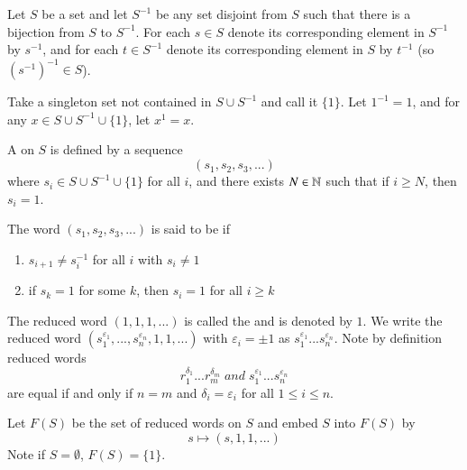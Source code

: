 \documentclass[12pt, a4paper, oneside, openright, titlepage]{book}
\begin{document}
\begin{cons}
        Let $S$ be a set and let $S^{-1}$ be any set disjoint from $S$ such that there is a bijection from $S$ to $S^{-1}$. For each $s \in S$ denote its corresponding element in $S^{-1}$ by $s^{-1}$, and for each $t \in S^{-1}$ denote its corresponding element in $S$ by $t^{-1}$ (so $(s^{-1})^{-1} \in S$). 

        Take a singleton set not contained in $S \cup S^{-1}$ and call it $\{1\}$. Let $1^{-1} = 1$, and for any $x \in S\cup S^{-1}\cup\{1\}$, let $x^1 = x$.

        A  on $S$ is defined by a sequence \begin{equation}
                (s_1,s_2,s_3,...)
        \end{equation}
        where $s_i \in S\cup S^{-1} \cup \{1\}$ for all $i$, and there exists $N \in \mathbb N$ such that if $i \geq N$, then $s_i = 1$.

        The word $(s_1,s_2,s_3,...)$ is said to be  if \begin{enumerate}
                \item $s_{i+1} \neq s_i^{-1}$ for all $i$ with $s_i \neq 1$
                \item if $s_k = 1$ for some $k$, then $s_i = 1$ for all $i \geq k$
        \end{enumerate}
        The reduced word $(1,1,1,...)$ is called the  and is denoted by $1$. We write the reduced word $(s_1^{\varepsilon_1},...,s_n^{\varepsilon_n},1,1,...)$ with $\varepsilon_i = \pm 1$ as $s_1^{\varepsilon_1}...s_n^{\varepsilon_n}$. Note by definition reduced words \begin{equation}
                r_1^{\delta_1}...r_m^{\delta_m}\;and\;s_1^{\varepsilon_1}...s_n^{\varepsilon_n}
        \end{equation}
        are equal if and only if $n = m$ and $\delta_i = \varepsilon_i$ for all $1\leq i \leq n$.

        Let $F(S)$ be the set of reduced words on $S$ and embed $S$ into $F(S)$ by \begin{equation}
                s \mapsto (s,1,1,...)
        \end{equation}
        Note if $S = \emptyset$, $F(S) = \{1\}$.
        

\end{cons}
\end{document}
